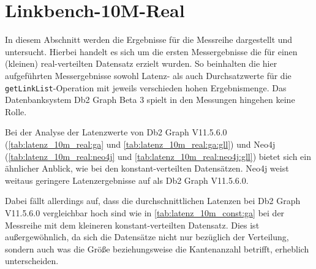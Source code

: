 \section{Linkbench-10M-Real}
\label{ergebnisse:10m_real}
In diesem Abschnitt werden die Ergebnisse für die Messreihe  dargestellt und untersucht. Hierbei handelt es sich um die ersten Messergebnisse die für einen (kleinen) real-verteilten Datensatz erzielt wurden. So beinhalten die hier aufgeführten Messergebnisse sowohl Latenz- als auch Durchsatzwerte für die \texttt{getLinkList}-Operation mit jeweils verschieden hohen Ergebnismenge. Das Datenbanksystem Db2 Graph Beta 3 spielt in den Messungen hingehen keine Rolle.

Bei der Analyse der Latenzwerte von Db2 Graph V11.5.6.0 (\autoref{tab:latenz_10m_real:ga} und \autoref{tab:latenz_10m_real:ga:gll}) und Neo4j (\autoref{tab:latenz_10m_real:neo4j} und \autoref{tab:latenz_10m_real:neo4j:gll}) bietet sich ein ähnlicher Anblick, wie bei den konstant-verteilten Datensätzen. Neo4j weist weitaus geringere Latenzergebnisse auf als Db2 Graph V11.5.6.0. 

Dabei fällt allerdings auf, dass die durchschnittlichen Latenzen bei Db2 Graph V11.5.6.0 vergleichbar hoch sind wie in \autoref{tab:latenz_10m_const:ga} bei der Messreihe  mit dem kleineren konstant-verteilten Datensatz. Dies ist außergewöhnlich, da sich die Datensätze nicht nur bezüglich der Verteilung, sondern auch was die Größe beziehungsweise die Kantenanzahl betrifft, erheblich unterscheiden.

\begin{table}[!h]
\centering
{}
\caption{Latenz Linkbench-10M-Real Db2 Graph V11.5.6.0}
\label{tab:latenz_10m_real:ga}
\end{table}    

